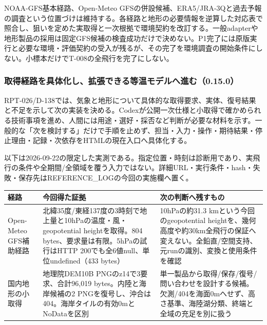 \documentclass[11pt,a4paper]{article}
\newcounter{none}
\begin{document}
NOAA-GFS基本経路、Open-Meteo
GFSの併設候補、ERA5/JRA-3Qと過去予報の調査という位置づけは維持する。各経路と地形の必要情報を逆算した対応表で照合し、狙いを定めた実取得と一次根拠で環境契約を改訂する。一般adapterや地形製品の採用は固定GFS候補の検査成功だけで決めない。P1完了には原版実行と必要な環境・評価契約の受入が残るが、その完了を環境調査の開始条件にしない。小標本だけでT-008の全飛行を完了にしない。

\subsubsection{取得経路を具体化し、拡張できる等温モデルへ進む（0.15.0）}\label{ux53d6ux5f97ux7d4cux8defux3092ux5177ux4f53ux5316ux3057ux62e1ux5f35ux3067ux304dux308bux7b49ux6e29ux30e2ux30c7ux30ebux3078ux9032ux30800.15.0}

RPT-026/D-138では、気象と地形について具体的な取得要求、実体、復号結果と不足を示して次の実装を決める。Codexが公開一次仕様と小取得で確かめられる技術事項を進め、人間には用途・選好・採否など判断が必要な材料を示す。一般的な「次を検討する」だけで手順を止めず、担当・入力・操作・期待結果・停止理由・記録・次依存をHTMLの現在入口へ具体化する。

以下は2026-09-22の限定した実測である。指定位置・時刻は診断用であり、実飛行の条件や全期間/全領域を覆う入力ではない。詳細URL・実行条件・hash・失敗・保存先はREFERENCE\_LOGの今回の実施欄へ置く。

{\def\LTcaptype{none} %
\begin{longtable}[]{@{}
  >{\raggedright\arraybackslash}p{}
  >{\raggedright\arraybackslash}p{}
  >{\raggedright\arraybackslash}p{}@{}}
\toprule\noalign{}
\begin{minipage}[b]{\linewidth}\raggedright
経路
\end{minipage} & \begin{minipage}[b]{\linewidth}\raggedright
今回得た証拠
\end{minipage} & \begin{minipage}[b]{\linewidth}\raggedright
次の判断へ残すもの
\end{minipage} \\
\midrule\noalign{}
\endhead
\bottomrule\noalign{}
\endlastfoot
Open-Meteo GFS補助経路 &
北緯35度/東経137度の3時刻で地上量と10hPaの温度・風・geopotential
heightを取得。804 bytes、要求量は有限。5hPaの試行はHTTP
200でも全6値null、単位undefined（433 bytes） & 10hPaの約31.3
kmという今回のgeopotential
heightを、幾何高度や約30km全飛行の保証へ変えない。全鉛直/空間支持、元runの識別、変換と使用条件を確認 \\
国内地形の小取得 & 地理院DEM10B PNGのz14で3要求、合計96,019
bytes。内陸と海岸候補の2
PNGを復号し、沖合は404。海岸タイルの有効0mとNoDataを区別 &
単一製品から取得/保存/復号/問い合わせを設計する候補。欠測/404を海面0mへせず、高さ基準、海陸湖分類、終端と全域の充足を別に扱う \\
\end{longtable}
}
\end{document}
